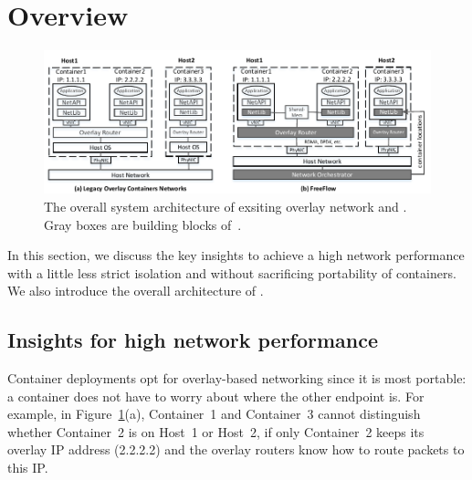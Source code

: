 \section{Overview} \label{sec:overview}

\begin{figure}[t!] 
     \centering 
     \includegraphics[width=7in]{figures/system-arch.pdf} 
    \caption{\label{fig:sysarch} The overall system architecture of exsiting overlay network and \sysname. Gray boxes are building blocks of~\sysname.} 
\end{figure} 

In this section, we discuss the key insights to achieve a high network
performance with a little less strict isolation and without sacrificing portability of containers. We also introduce the overall architecture 
of \sysname. 


\subsection{Insights for high network performance}

Container deployments opt for overlay-based networking since it is most
portable: a container does not have to worry about where the other endpoint is.
For example, in Figure~\ref{fig:sysarch}(a), Container~1 and Container~3 cannot
distinguish whether Container~2 is on Host~1 or Host~2, if only Container~2
keeps its overlay IP address (2.2.2.2) and the overlay routers know how to
route packets to this IP. 

